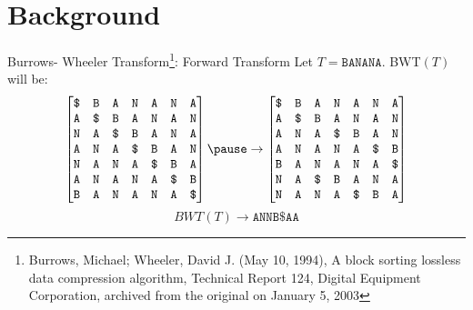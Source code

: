 \documentclass[mathserif]{beamer}
\begin{document}
\section{Background}
\begin{frame}{Burrows- Wheeler Transform\footnote{Burrows, Michael; Wheeler, David J. (May 10, 1994), A block sorting lossless data compression algorithm, Technical Report 124, Digital Equipment Corporation, archived from the original on January 5, 2003}: Forward Transform}
    Let $T=\texttt{BANANA}$. BWT$(T)$ will be:
    \[
    \begin{bmatrix}
        \texttt{\$} &\texttt{B} &\texttt{A} &\texttt{N} &\texttt{A} &\texttt{N} &\texttt{A} \\
        \texttt{A} &\texttt{\$} &\texttt{B} &\texttt{A} &\texttt{N} &\texttt{A} &\texttt{N} \\
        \texttt{N} &\texttt{A} &\texttt{\$} &\texttt{B} &\texttt{A} &\texttt{N} &\texttt{A} \\
        \texttt{A} &\texttt{N} &\texttt{A} &\texttt{\$} &\texttt{B} &\texttt{A} &\texttt{N} \\
        \texttt{N} &\texttt{A} &\texttt{N} &\texttt{A} &\texttt{\$} &\texttt{B} &\texttt{A} \\
        \texttt{A} &\texttt{N} &\texttt{A} &\texttt{N} &\texttt{A} &\texttt{\$} &\texttt{B} \\
        \texttt{B} &\texttt{A} &\texttt{N} &\texttt{A} &\texttt{N} &\texttt{A} &\texttt{\$} \\
    \end{bmatrix} \pause 
    \rightarrow
    \begin{bmatrix}
        \texttt{\$} &\texttt{B} &\texttt{A} &\texttt{N} &\texttt{A} &\texttt{N} &\texttt{A} \\
        \texttt{A} &\texttt{\$} &\texttt{B} &\texttt{A} &\texttt{N} &\texttt{A} &\texttt{N} \\
        \texttt{A} &\texttt{N} &\texttt{A} &\texttt{\$} &\texttt{B} &\texttt{A} &\texttt{N} \\
        \texttt{A} &\texttt{N} &\texttt{A} &\texttt{N} &\texttt{A} &\texttt{\$} &\texttt{B} \\
        \texttt{B} &\texttt{A} &\texttt{N} &\texttt{A} &\texttt{N} &\texttt{A} &\texttt{\$} \\
        \texttt{N} &\texttt{A} &\texttt{\$} &\texttt{B} &\texttt{A} &\texttt{N} &\texttt{A} \\
        \texttt{N} &\texttt{A} &\texttt{N} &\texttt{A} &\texttt{\$} &\texttt{B} &\texttt{A} \\
    \end{bmatrix}\]
    \[
    BWT(T)\rightarrow \texttt{ANNB\$AA}
    \]

\end{frame}
\end{document}
